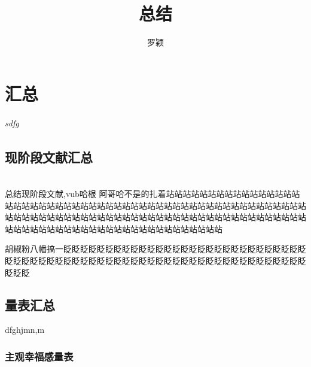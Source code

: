 \documentclass{ctexart}
\begin{document}
\title{总结}
\author{罗颖}
\date{}

\maketitle
\chapter{汇总}
\subparagraph{sdfg}
\section{现阶段文献汇总}
  \\
总结现阶段文献,vub哈根 阿哥哈不是的扎着站站站站站站站站站站站站站站站站站站站站站站站站站站站站站站站站站站站站站站站站站站站站站站站站站站站站站站站站站站站站站站站站站站站站站站站站站站站站站站站站站站站站站站站站站站站站站站站站站站站站站站站站站站站站站站站站站站
\par{胡椒粉}八幡搞一眨眨眨眨眨眨眨眨眨眨眨眨眨眨眨眨眨眨眨眨眨眨眨眨眨眨眨眨眨眨眨眨眨眨眨眨眨眨眨眨眨眨眨眨眨眨眨眨眨眨眨眨眨眨眨眨眨眨眨眨眨眨眨眨眨眨眨眨
\section{量表汇总}
dfghjmn,m
\subsection{主观幸福感量表}
\end{document}
